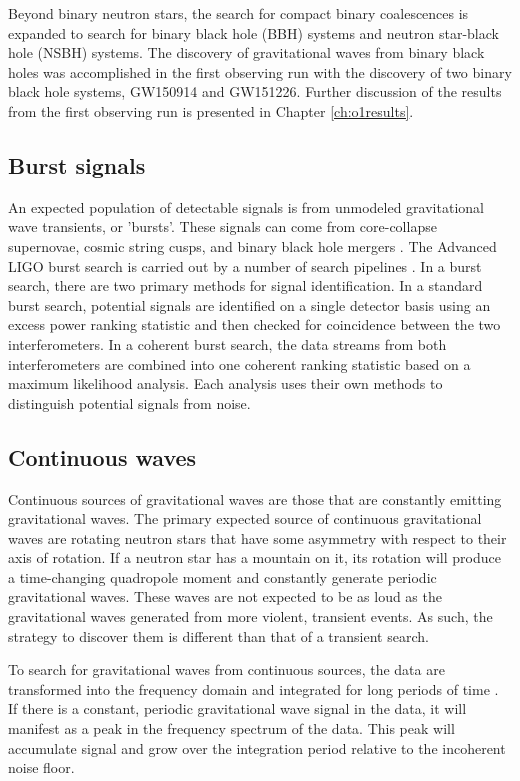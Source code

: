 Beyond binary neutron stars, the search for compact binary coalescences 
is expanded to search for binary black hole (BBH) systems and neutron star-black 
hole (NSBH) systems. The discovery of gravitational waves from binary black holes 
was accomplished in the 
first observing run with the discovery of two binary black hole systems, GW150914 
and GW151226. Further discussion of the results from the first observing run is 
presented in Chapter \ref{ch:o1results}.

\subsection{Burst signals}

An expected population of detectable signals is from unmodeled gravitational 
wave transients, or 'bursts'. These signals can come from core-collapse 
supernovae, cosmic string cusps, and binary black hole mergers 
\cite{Damour:2004kw,GW150914-BURST,lrr-2011-1}. The Advanced LIGO burst 
search is carried out by a number of search pipelines 
\cite{Lynch:2015,BayesWave,Klimenko:2007hd}. 
In a burst search, there are two primary methods for signal identification. 
In a standard burst search, potential signals are identified on a single detector 
basis using an excess power ranking statistic and then checked for coincidence 
between the two interferometers. In a coherent burst search, the data streams 
from both interferometers are combined into one coherent ranking statistic based 
on a maximum likelihood analysis. Each analysis uses their own methods to 
distinguish potential signals from noise.

\subsection{Continuous waves}

Continuous sources of gravitational waves are those that are constantly emitting 
gravitational waves. The primary expected source of continuous gravitational 
waves are rotating neutron stars that have some asymmetry with respect to their 
axis of rotation. If a neutron star has a mountain on it, its rotation will 
produce a time-changing quadropole moment and constantly generate periodic 
gravitational waves. These waves are not expected to be as loud as the 
gravitational waves generated from more violent, transient events. As such, 
the strategy to discover them is different than that of a transient search.

To search for gravitational waves from continuous sources, the data are 
transformed into the frequency domain and integrated for long periods of 
time \cite{CW-all-sky,EinsteinHome}. 
If there is a constant, periodic gravitational wave signal in the data, it 
will manifest as a peak in the frequency spectrum of the data. This peak will 
accumulate signal and grow over the integration period relative to the 
incoherent noise floor. 


